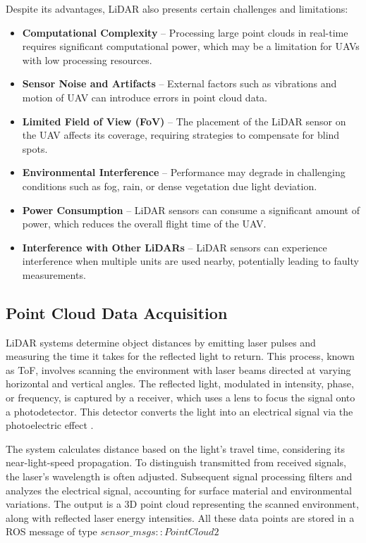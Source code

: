             Despite its advantages, \ac{LiDAR} also presents certain challenges and limitations:  
            \begin{itemize}  
                \item \textbf{Computational Complexity} -- Processing large point clouds in real-time requires significant computational power, which may be a limitation for \ac{UAV}s with low processing resources.
                \item \textbf{Sensor Noise and Artifacts} -- External factors such as vibrations and motion of \ac{UAV} can introduce errors in point cloud data.  
                \item \textbf{Limited Field of View (FoV)} -- The placement of the \ac{LiDAR} sensor on the \ac{UAV} affects its coverage, requiring strategies to compensate for blind spots.  
                \item \textbf{Environmental Interference} -- Performance may degrade in challenging conditions such as fog, rain, or dense vegetation due light deviation.  
                \item \textbf{Power Consumption} -- \ac{LiDAR} sensors can consume a significant amount of power, which reduces the overall flight time of the \ac{UAV}.
                \item \textbf{Interference with Other LiDARs} -- \ac{LiDAR} sensors can experience interference when multiple units are used nearby, potentially leading to faulty measurements.
            \end{itemize}

        \subsection{Point Cloud Data Acquisition}
            \ac{LiDAR} systems determine object distances by emitting laser pulses and measuring the time it takes for the reflected light to return. 
            This process, known as \ac{ToF}, involves scanning the environment with laser beams directed at varying horizontal and vertical angles. 
            The reflected light, modulated in intensity, phase, or frequency, is captured by a receiver, which uses a lens to focus the signal onto a photodetector. 
            This detector converts the light into an electrical signal via the photoelectric effect \cite{lidar_how_works}.

            The system calculates distance based on the light's travel time, considering its near-light-speed propagation. 
            To distinguish transmitted from received signals, the laser's \setcounter{tocdepth}{1}
            wavelength is often adjusted. 
            Subsequent signal processing filters and analyzes the electrical signal, accounting for surface material and environmental variations. 
            The output is a 3D point cloud representing the scanned environment, along with reflected laser energy intensities. 
            All these data points are stored in a ROS message of type \(sensor\_msgs::PointCloud2\)

